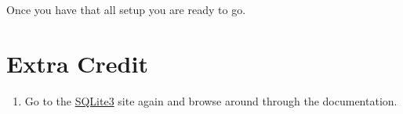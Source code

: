 Once you have that all setup you are ready to go.

\section{Extra Credit}

\begin{enumerate}
\item Go to the \href{http://www.sqlite.org/download.html}{SQLite3} site again and browse around through the documentation.
\end{enumerate}



